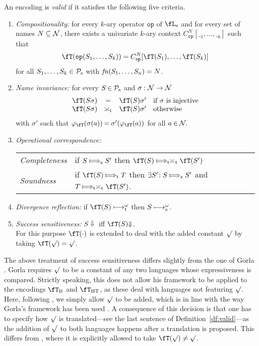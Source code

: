 \documentclass[runningheads]{llncs}
\newcommand{\pT}{T}                      %
\newcommand{\fTHT}{\fT_{\textrm{HT}}}       %
\newcommand{\N} {{\cal N}}               %
\newcommand{\fn}{{\it fn}}               %
\newcommand{\trans}[1]{\fT(#1)}
\newcommand{\subtrans}{\fT}
\newcommand{\op}{\mathtt{op}}
\begin{document}
\begin{definition}\rm\label{df:valid}
An encoding is \emph{valid} if it satisfies the following five criteria.
\begin{enumerate}
\item \emph{Compositionality:} for every $k$-ary operator $\op$ of
  $\fL_{\rm s}$ and for every set of names $N\subseteq\N$,
  there exists a univariate $k$-ary context $C_\op^N[\__1,\dots,\__k]$ such that
  $$\trans{\op(S_1,\ldots,S_k)} = C_\op^N[\trans{S_1},\ldots,\trans{S_k}]$$
  for all $S_1,\ldots,S_k\in\mathcal{P}_{\rm s}$ with $\fn(S_1,\dots,S_n)=N$.
\item \emph{Name invariance:} for every $S\mathbin\in\mathcal{P}_{\rm s}$ and
  $\sigma:\N\rightarrow\N$
  \[\begin{array}{ccc@{\quad}l}
    \trans{S\sigma} & = & \trans{S}\sigma' & \mbox{if $\sigma$ is injective}\\
    \trans{S\sigma} & \asymp_{\rm t} & \trans{S}\sigma' & \mbox{otherwise}\\
    \end{array}\]
  with $\sigma'$ such that
  $\varphi_{\subtrans}(\sigma(a))\mathbin=\sigma'(\varphi_{\subtrans}(a))$
  for all $a\mathbin\in\N\!$.
\item \emph{Operational correspondence:}\\
  \begin{tabular}{@{}ll}
   \emph{Completeness} & if $S \Longmapsto_{\rm s} S'$ then $\trans{S}\Longmapsto_{\rm t}\asymp_{\rm t} \trans{S'}$\\
   \emph{Soundness} & if $\trans{S} \Longmapsto_{\rm t} \pT$ then $\exists S'\!: S\Longmapsto_{\rm s} S'$ and $\pT\Longmapsto_{\rm t}\asymp_{\rm t} \trans{S'}$.
  \end{tabular}
\item \emph{Divergence reflection:} 
  if $\trans{S} \longmapsto_{\rm t}^\omega$ then $S \longmapsto_{\rm s}^\omega$.
\item \emph{Success sensitiveness:}
  $S {\Downarrow}$ iff $\trans{S}{\Downarrow}$.\\
  For this purpose $\trans{\cdot}$ is extended to deal with the added constant $\surd$ by taking $\trans{\surd}=\surd$.
\end{enumerate}
\end{definition}
The above treatment of success sensitiveness differs slightly from the one of Gorla \cite{Gorla10a}.
Gorla requires $\surd$ to be a constant of any two languages whose expressiveness is
compared. Strictly speaking, this does not allow his framework to be applied to the encodings
$\fT_{\rm B}$ and $\fTHT$, as these deal with languages not featuring $\surd$.  Here, following
\cite{vG18a}, we simply allow $\surd$ to be added, which is in line with the way Gorla's framework
has been used \cite{Gorla10b,LPSS10,PSN11,PN12,PNG13,GW14,EPTCS160.4,EPTCS189.9,GWL16}.
A consequence of this decision is that one has to specify how $\surd$ is translated---see the last
sentence of Definition~\ref{df:valid}---as the addition of $\surd$ to both languages happens after a
translation is proposed. This differs from \cite{Gorla10a}, where it is explicitly allowed to take
$\trans{\surd} \neq \surd$.
\end{document}
